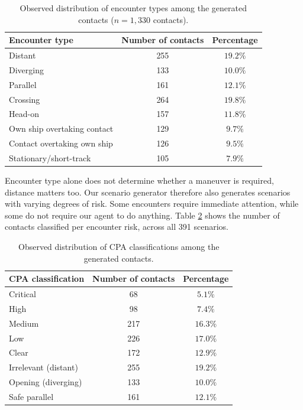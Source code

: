 \documentclass[10pt]{reportMaster}
\begin{document}
\begin{table}[htbp]
    \centering
    \begin{tabular}{l c c}
        \hline
        \textbf{Encounter type} & \textbf{Number of contacts} &
        \textbf{Percentage} \\
        \hline
        Distant & 255 & $19.2\%$ \\
        Diverging & 133 & $10.0\%$ \\
        Parallel & 161 & $12.1\%$ \\
        Crossing & 264 & $19.8\%$ \\
        Head-on & 157 & $11.8\%$ \\
        Own ship overtaking contact & 129 & $9.7\%$ \\
        Contact overtaking own ship & 126 & $9.5\%$ \\
        Stationary/short-track & 105 & $7.9\%$ \\
        \hline
    \end{tabular}
    \caption{Observed distribution of encounter types among the generated
    contacts ($n=1{,}330$ contacts).}
    \label{tab:generated_encounter_type_distribution}
\end{table}



Encounter type alone does not determine whether a maneuver is required, distance matters too. Our scenario generator therefore also generates scenarios with varying degrees of risk. Some encounters require immediate attention, while some do not require our agent to do anything. Table \ref{tab:generated_cpa_distribution} shows the number of contacts classified per encounter risk, across all 391 scenarios. 

\begin{table}[htbp]
    \centering
    \begin{tabular}{l c c}
        \hline
        \textbf{CPA classification} & \textbf{Number of contacts} &
        \textbf{Percentage} \\
        \hline
        Critical & 68 & $5.1\%$ \\
        High & 98 & $7.4\%$ \\
        Medium & 217 & $16.3\%$ \\
        Low & 226 & $17.0\%$ \\
        Clear & 172 & $12.9\%$ \\
        Irrelevant (distant) & 255 & $19.2\%$ \\
        Opening (diverging) & 133 & $10.0\%$ \\
        Safe parallel & 161 & $12.1\%$ \\
        \hline
    \end{tabular}
    \caption{Observed distribution of CPA classifications among the generated
    contacts.}
    \label{tab:generated_cpa_distribution}
\end{table}
\end{document}
